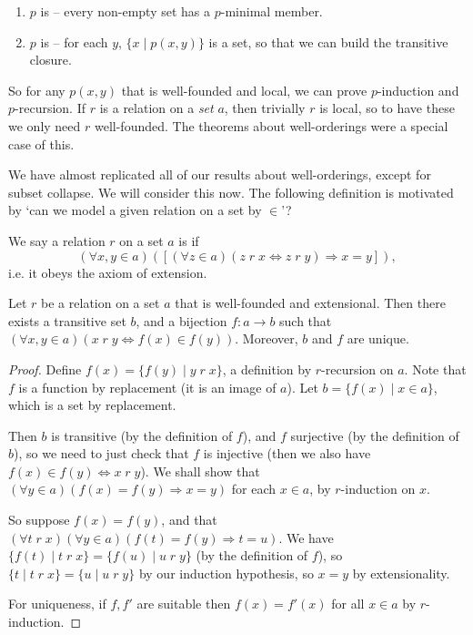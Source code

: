 \documentclass[a4paper, 10pt, twocolumn]{amsart}
\begin{document}
\begin{enumerate}
  \item $p$ is  -- every non-empty set has a $p$-minimal member.
  \item $p$ is  -- for each $y$, $\{x \mid p(x, y)\}$ is a set, so that we can build the transitive closure.
\end{enumerate}
So for any $p(x, y)$ that is well-founded and local, we can prove $p$-induction and $p$-recursion. If $r$ is a relation on a \emph{set} $a$, then trivially $r$ is local, so to have these we only need $r$ well-founded. The theorems about well-orderings were a special case of this.

We have almost replicated all of our results about well-orderings, except for subset collapse. We will consider this now. The following definition is motivated by `can we model a given relation on a set by $\in$'?

\begin{definition}[Extensional]
  We say a relation $r$ on a set $a$ is  if
  $$
  (\forall x, y \in a)([(\forall z \in a)(z\; r\; x \Leftrightarrow z\;r\;y) \Rightarrow x = y]),
  $$
  i.e. it obeys the axiom of extension.
\end{definition}

\begin{theorem}
  Let $r$ be a relation on a set $a$ that is well-founded and extensional. Then there exists a transitive set $b$, and a bijection $f: a \rightarrow b$ such that $(\forall x, y \in a)(x\; r\; y \Leftrightarrow f(x) \in f(y))$. Moreover, $b$ and $f$ are unique.
\end{theorem}
\begin{proof}
  Define $f(x) = \{f(y) \mid y\; r\; x\}$, a definition by $r$-recursion on $a$. Note that $f$ is a function by replacement (it is an image of $a$). Let $b = \{f(x) \mid x \in a\}$, which is a set by replacement.

  Then $b$ is transitive (by the definition of $f$), and $f$ surjective (by the definition of $b$), so we need to just check that $f$ is injective (then we also have $f(x) \in f(y) \Leftrightarrow x\;r\;y$). We shall show that $(\forall y \in a)(f(x) = f(y) \Rightarrow x = y)$ for each $x \in a$, by $r$-induction on $x$.

  So suppose $f(x) = f(y)$, and that $(\forall t\;r\;x)(\forall y \in a)(f(t) = f(y) \Rightarrow t = u)$. 
  We have $\{f(t) \mid t\;r\;x\} = \{f(u) \mid u\;r\;y\}$ (by the definition of $f$), so $\{t \mid t\;r\;x\} = \{u \mid u\;r\;y\}$ by our induction hypothesis, so $x = y$ by extensionality.

  For uniqueness, if $f, f'$ are suitable then $f(x) = f'(x)$ for all $x \in a$ by $r$-induction.
\end{proof}
\end{document}
